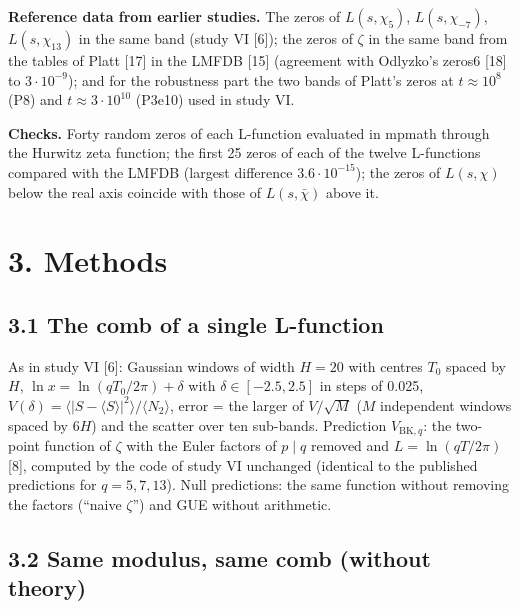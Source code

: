 \documentclass[
  10pt,
]{article}
\begin{document}
\textbf{Reference data from earlier studies.} The zeros of
\(L(s, \chi_5)\), \(L(s, \chi_{-7})\), \(L(s, \chi_{13})\) in the same
band (study VI {[}6{]}); the zeros of \(\zeta\) in the same band from
the tables of Platt {[}17{]} in the LMFDB {[}15{]} (agreement with
Odlyzko's zeros6 {[}18{]} to \(3\cdot10^{-9}\)); and for the robustness
part the two bands of Platt's zeros at \(t \approx 10^8\) (P8) and
\(t \approx 3\cdot10^{10}\) (P3e10) used in study VI.

\textbf{Checks.} Forty random zeros of each L-function evaluated in
mpmath through the Hurwitz zeta function; the first 25 zeros of each of
the twelve L-functions compared with the LMFDB (largest difference
\(3.6\cdot10^{-15}\)); the zeros of \(L(s, \chi)\) below the real axis
coincide with those of \(L(s, \bar\chi)\) above it.

\hypertarget{methods}{%
\section{3. Methods}\label{methods}}

\hypertarget{the-comb-of-a-single-l-function}{%
\subsection{3.1 The comb of a single
L-function}\label{the-comb-of-a-single-l-function}}

As in study VI {[}6{]}: Gaussian windows of width \(H = 20\) with
centres \(T_0\) spaced by \(H\), \(\ln x = \ln(qT_0/2\pi) + \delta\)
with \(\delta \in [-2.5, 2.5]\) in steps of 0.025,
\(V(\delta) = \langle|S - \langle S\rangle|^2\rangle/\langle N_2\rangle\),
error = the larger of \(V/\sqrt M\) (\(M\) independent windows spaced by
\(6H\)) and the scatter over ten sub-bands. Prediction
\(V_{\mathrm{BK},q}\): the two-point function of \(\zeta\) with the
Euler factors of \(p \mid q\) removed and \(L = \ln(qT/2\pi)\) {[}8{]},
computed by the code of study VI unchanged (identical to the published
predictions for \(q = 5, 7, 13\)). Null predictions: the same function
without removing the factors (``naive \(\zeta\)'') and GUE without
arithmetic.

\hypertarget{same-modulus-same-comb-without-theory}{%
\subsection{3.2 Same modulus, same comb (without
theory)}\label{same-modulus-same-comb-without-theory}}
\end{document}
